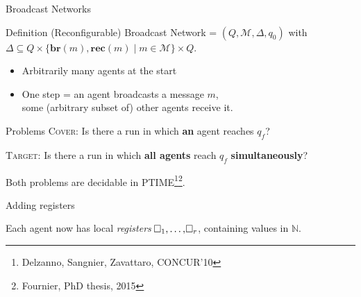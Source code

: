 \documentclass{beamer}
\newcommand{\messages}{\mathcal{M}}
\newcommand{\reg}{\hspace{-0.5mm}\square}
\newcommand{\COVER}{\textsc{Cover}\xspace}
\newcommand{\TARGET}{\textsc{Target}\xspace}
\begin{document}
\begin{frame}{Broadcast Networks}
	\begin{block}{Definition\footnotemark}
		(Reconfigurable) Broadcast Network = $(Q, \messages, \Delta, q_0)$ with $\Delta \subseteq Q\times \{\mathbf{br}(m), \mathbf{rec}(m) \mid m \in \messages\} \times Q$.
	\end{block}
	
	\pause
	
	\begin{itemize}
		\item Arbitrarily many agents at the start
		
		\item One step = an agent broadcasts a message $m$,\\ some (arbitrary subset of) other agents receive it.
	\end{itemize}
	
	\pause 
	
	\begin{block}{Problems}
		{\COVER}: Is there a run in which \textbf{an} agent reaches $q_f$?
		
		{\TARGET}: Is there a run in which \textbf{all agents} reach $q_f$ \textbf{simultaneously}?
	\end{block}
	
	Both problems are decidable in PTIME\footnote[1]{Delzanno, Sangnier, Zavattaro, CONCUR'10}\footnote<3>{Fournier, PhD thesis, 2015}.
\end{frame}

\begin{frame}{Adding registers}
	
	Each agent now has local \emph{registers} $\reg_1, \ldots, \reg_r$, containing values in $\mathbb{N}$.\vspace{0.3cm}\pause
	\begin{center}
	
	\end{center}
\end{frame}
\end{document}
